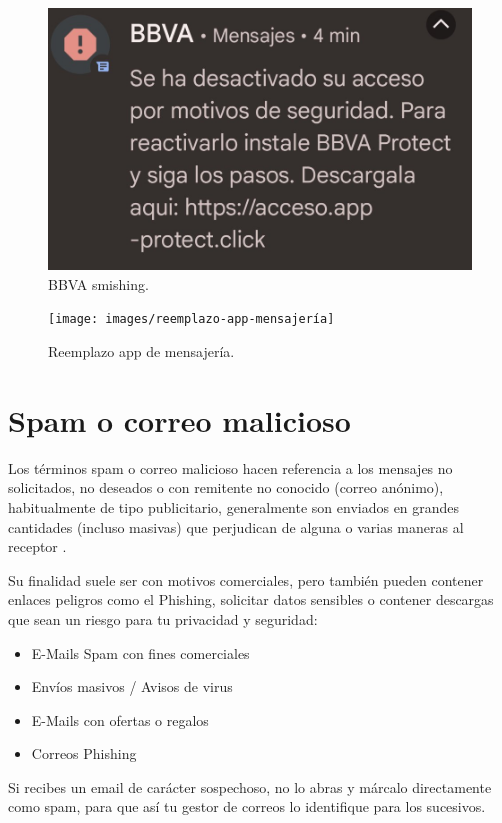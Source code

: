 \documentclass[
  a4paper,
  openany]{book}
\begin{document}
\begin{figure}

{\centering \includegraphics[width=0.35\linewidth]{images/bbva-smishing} 

}

\caption{BBVA smishing.}\label{fig:unnamed-chunk-18}
\end{figure}

\begin{figure}

{\centering \texttt{[image: images/reemplazo-app-mensajería]} 

}

\caption{Reemplazo app de mensajería.}\label{fig:unnamed-chunk-19}
\end{figure}

\hypertarget{spam-o-correo-malicioso}{%
\section{Spam o correo malicioso}\label{spam-o-correo-malicioso}}

Los términos spam o correo malicioso hacen referencia a los mensajes no solicitados, no deseados o con remitente no conocido (correo anónimo), habitualmente de tipo publicitario, generalmente son enviados en grandes cantidades (incluso masivas) que perjudican de alguna o varias maneras al receptor \citep{WIKI-spam}.

Su finalidad suele ser con motivos comerciales, pero también pueden contener enlaces peligros como el Phishing, solicitar datos sensibles o contener descargas que sean un riesgo para tu privacidad y seguridad:

\begin{itemize}
\item
  E-Mails Spam con fines comerciales
\item
  Envíos masivos / Avisos de virus
\item
  E-Mails con ofertas o regalos
\item
  Correos Phishing
\end{itemize}

Si recibes un email de carácter sospechoso, no lo abras y márcalo directamente como spam, para que así tu gestor de correos lo identifique para los sucesivos.
\end{document}
